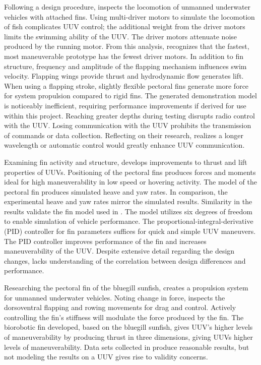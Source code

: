 \documentclass[]{IEEEtran}
\begin{document}
Following a design procedure, \cite{xu2007initial} inspects the locomotion of unmanned underwater vehicles with attached fins.  Using multi-driver motors to simulate the locomotion of fish complicates UUV control; the additional weight from the driver motors limits the swimming ability of the UUV.  The driver motors attenuate noise produced by the running motor.  From this analysis, \cite{xu2007initial} recognizes that the fastest, most maneuverable prototype has the fewest driver motors.  In addition to fin structure, frequency and amplitude of the flapping mechanism influences swim velocity.  Flapping wings provide thrust and hydrodynamic flow generates lift.  When using a flapping stroke, slightly flexible pectoral fins generate more force for system propulsion compared to rigid fins.  The generated demonstration model is noticeably inefficient, requiring performance improvements if derived for use within this project.  Reaching greater depths during testing disrupts radio control with the UUV.  Losing communication with the UUV prohibits the transmission of commands or data collection.  Reflecting on their research, \cite{xu2007initial} realizes a longer wavelength or automatic control would greatly enhance UUV communication.  

Examining fin activity and structure, \cite{geder2013maneuvering} develops improvements to thrust and lift properties of UUVs.  Positioning of the pectoral fins produces forces and moments ideal for high maneuverability in low speed or hovering activity.  The model of the pectoral fin produces simulated heave and yaw rates.  In comparison, the experimental heave and yaw rates mirror the simulated results.  Similarity in the results validate the fin model used in \cite{geder2013maneuvering}.  The model utilizes six degrees of freedom to enable simulation of vehicle performance.  The proportional-integral-derivative (PID) controller for fin parameters suffices for quick and simple UUV maneuvers.  The PID controller improves performance of the fin and increases maneuverability of the UUV.  Despite extensive detail regarding the design changes, \cite{geder2013maneuvering} lacks understanding of the correlation between design differences and performance.  

Researching the pectoral fin of the bluegill sunfish, \cite{tangorra2006biorobotic} creates a propulsion system for unmanned underwater vehicles.  Noting change in force, \cite{tangorra2006biorobotic} inspects the dorsoventral flapping and rowing movements for drag and control.  Actively controlling the fin’s stiffness will modulate the force produced by the fin.  The biorobotic fin developed, based on the bluegill sunfish, gives UUV’s higher levels of maneuverability by producing thrust in three dimensions, giving UUVs higher levels of maneuverability. Data sets collected in \cite{tangorra2006biorobotic} produce reasonable results, but not modeling the results on a UUV gives rise to validity concerns.  
\end{document}
